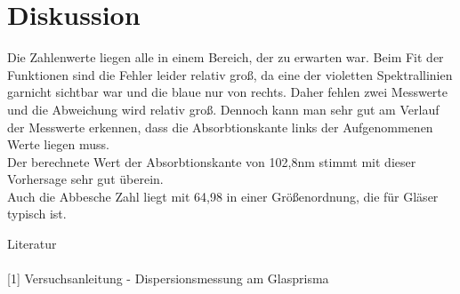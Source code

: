 \section{Diskussion}
Die Zahlenwerte liegen alle in einem Bereich, der zu erwarten war. Beim Fit der Funktionen sind die Fehler leider relativ groß, da eine der violetten Spektrallinien garnicht sichtbar war und die blaue nur von rechts. Daher fehlen zwei Messwerte und die Abweichung wird relativ groß. Dennoch kann man sehr gut am Verlauf der Messwerte erkennen, dass die Absorbtionskante links der Aufgenommenen Werte liegen muss.\\
Der berechnete Wert der Absorbtionskante von 102,8nm stimmt mit dieser Vorhersage sehr gut überein.\\
Auch die Abbesche Zahl liegt mit 64,98 in einer Größenordnung, die für Gläser typisch ist.



\parskip 300pt
\Large{Literatur}\\\\
\large{[1] Versuchsanleitung - Dispersionsmessung am Glasprisma}\\\\

